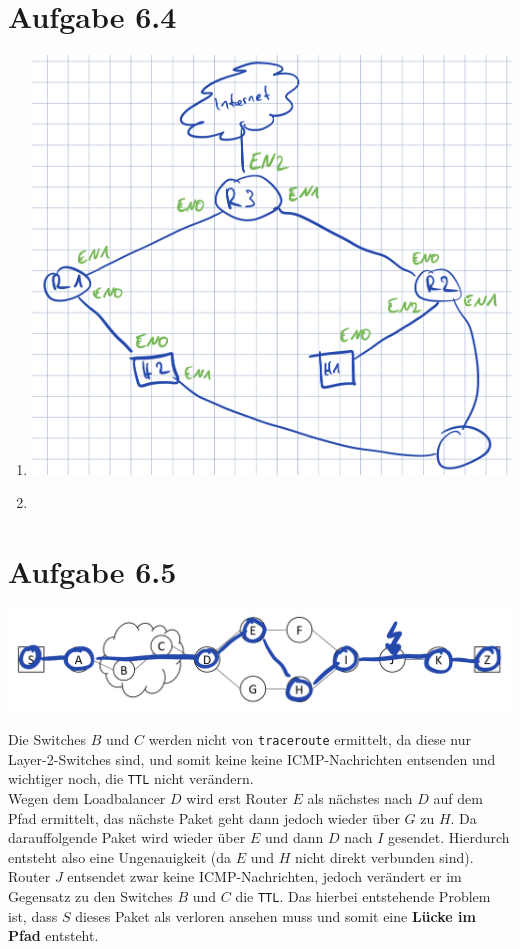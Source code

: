 \documentclass[12pt, a4paper]{article}
\begin{document}
\section*{Aufgabe 6.4}
\begin{enumerate}[label=\alph*)]
	\item	\includegraphics[scale=0.5]{6.4_a.png}
	\item	
\end{enumerate}


\newpage


\section*{Aufgabe 6.5}
\includegraphics[scale=0.5]{6.5.png}

Die Switches $B$ und $C$ werden nicht von \verb|traceroute| ermittelt, da diese nur Layer-2-Switches sind, und somit keine keine ICMP-Nachrichten entsenden und wichtiger noch, die \verb|TTL| nicht verändern.\\
Wegen dem Loadbalancer $D$ wird erst Router $E$ als nächstes nach $D$ auf dem Pfad ermittelt, das nächste Paket geht dann jedoch wieder über $G$ zu $H$. Da darauffolgende Paket wird wieder über $E$ und dann $D$ nach $I$ gesendet. Hierdurch entsteht also eine Ungenauigkeit (da $E$ und $H$ nicht direkt verbunden sind).\\
Router $J$ entsendet zwar keine ICMP-Nachrichten, jedoch verändert er im Gegensatz zu den Switches $B$ und $C$ die \verb|TTL|. Das hierbei entstehende Problem ist, dass $S$ dieses Paket als verloren ansehen muss und somit eine \textbf{Lücke im Pfad} entsteht.
\end{document}
